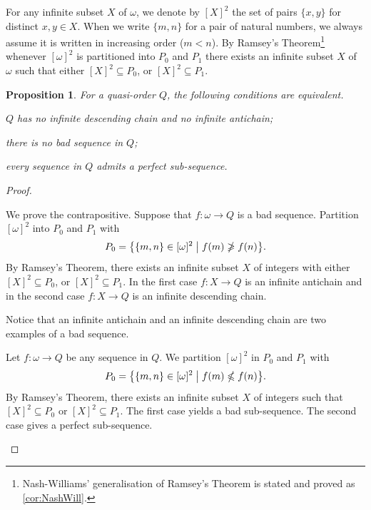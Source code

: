 \documentclass{article}%
\theoremstyle{plain}
\newtheorem{proposition}[theorem]{Proposition}
\theoremstyle{definition}
\theoremstyle{remark}
\begin{document}
For any infinite subset $X$ of $\omega$, we denote by $[X]^{2}$ the set of pairs $\{x,y\}$ for distinct $x, y\in X$. When we write $\{m,n\}$ for a pair of natural numbers, we always assume it is written in increasing order ($m<n$). By Ramsey's Theorem\footnote{Nash-Williams' generalisation of Ramsey's Theorem is stated and proved as \cref{cor:NashWill}.} \cite{ramsey1930problem} whenever $[\omega]^{2}$ is partitioned into $P_{0}$ and $P_{1}$ there exists an infinite subset $X$ of $\omega$ such that either $[X]^{2}\subseteq P_{0}$, or $[X]^{2}\subseteq P_{1}$.

\begin{proposition}\label{prop:ClassicEquWqo1}
For a quasi-order $Q$, the following conditions are equivalent.
\begin{enumWqo}[series=Wqo]
\item \label{Item:1}$Q$ has no infinite descending chain and no infinite antichain;

\item \label{Item:2}there is no bad sequence in $Q$;

\item \label{Item:3}every sequence in $Q$ admits a perfect sub-sequence.
\end{enumWqo}
\end{proposition}
\begin{proof}
\begin{descProofUp}
\item[\cref{Item:1}$\to$\cref{Item:2}] We prove the contrapositive. Suppose that $f:\omega\to Q$ is a bad sequence. Partition $[\omega]^{2}$ into $P_{0}$ and $P_{1}$ with 
\[
P_{0}=\bigl\{\{m,n\}\in[\omega]^{2}\bigm\vert f(m)\ngeq f(n)\bigr\}.
\]
By Ramsey's Theorem, there exists an infinite subset $X$ of integers with either $[X]^{2}\subseteq P_{0}$, or $[X]^{2}\subseteq P_{1}$. In the first case $f:X\to Q$ is an infinite antichain and in the second case $f:X\to Q$ is an infinite descending chain.

\item[\cref{Item:2}$\to $\cref{Item:1}] Notice that an infinite antichain and an infinite descending chain are two examples of a bad sequence.

\item[\cref{Item:2}$\leftrightarrow $\cref{Item:3}] Let $f:\omega \to Q$ be any sequence in $Q$. 
We partition $[\omega]^{2}$ in $P_{0}$ and $P_{1}$ with 
\[
P_{0}=\bigl\{\{m,n\}\in[\omega]^{2}\bigm| f(m)\nleq f(n)\bigr\}.
\]
By Ramsey's Theorem, there exists an infinite subset $X$ of integers such that $[X]^{2}\subseteq P_{0}$ or $[X]^{2}\subseteq P_{1}$. The first case yields a bad sub-sequence. The second case gives a perfect sub-sequence. \qedhere
\end{descProofUp}
\end{proof}
\end{document}
